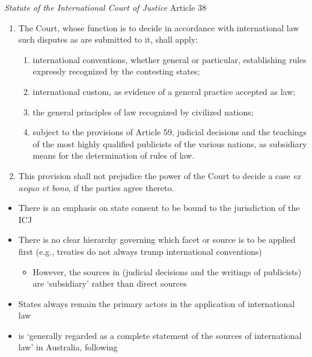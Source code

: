 \begin{statutedetails}{\textit{Statute of the International Court of Justice} Article 38}\label{ICJ Statute Art 38}
    \flushleft
    \begin{enumerate}
        \item The Court, whose function is to decide in accordance with international law such disputes as are submitted to it, shall apply:
        \begin{enumerate}[label=\alph*.]
            \item international conventions, whether general or particular, establishing rules expressly recognized by the contesting states;
            \item international custom, as evidence of a general practice accepted as law;
            \item the general principles of law recognized by civilized nations;
            \item subject to the provisions of Article 59, judicial decisions and the teachings of the most highly qualified publicists of the various nations, as subsidiary means for the determination of rules of law.
        \end{enumerate}
        \item This provision shall not prejudice the power of the Court to decide a case \textit{ex aequo et bono}, if the parties agree thereto.
    \end{enumerate}
\end{statutedetails}

\begin{itemize}
    \item There is an emphasis on state consent to be bound to the jurisdiction of the ICJ
    \item There is no clear hierarchy governing which facet or source is to be applied first (e.g., treaties do not always trump international conventions)
    \begin{itemize}
        \item However, the sources in  (judicial decisions and the writings of publicists) are `subsidiary' rather than direct sources
    \end{itemize}
    \item States always remain the primary actors in the application of international law
    \item {} is `generally regarded as a complete statement of the sources of international law' in Australia, following 
\end{itemize}

